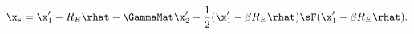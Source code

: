 \begin{equation}
\x_s= \x'_1 - R_E\rhat -  \GammaMat\x'_2 - \frac{1}{2}(\x'_1 - \beta R_E\rhat) \sF (\x'_1 - \beta R_E \rhat).
\label{eq:backgroundorder3}
\end{equation}
  
  